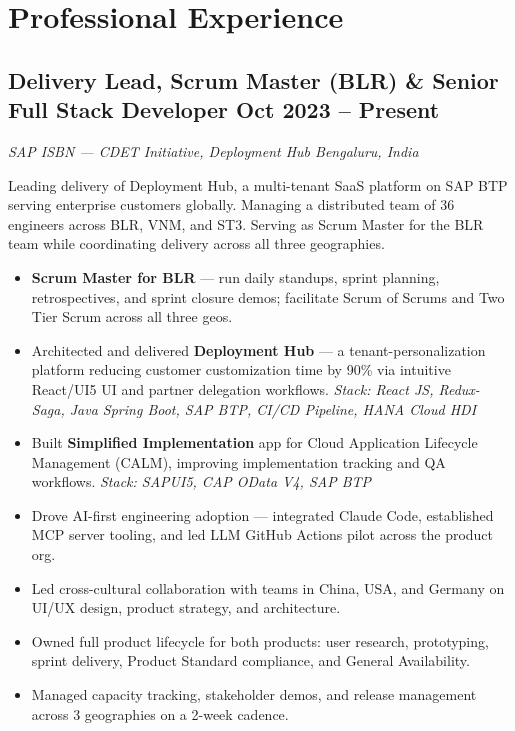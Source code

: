 \documentclass[11pt,a4paper]{article}
\begin{document}
\section{Professional Experience}

\subsection{Delivery Lead, Scrum Master (BLR) \& Senior Full Stack Developer \hfill \normalfont\small Oct 2023 -- Present}
\textit{SAP ISBN --- CDET Initiative, Deployment Hub \quad Bengaluru, India}

Leading delivery of Deployment Hub, a multi-tenant SaaS platform on SAP BTP serving enterprise
customers globally. Managing a distributed team of 36 engineers across BLR, VNM, and ST3.
Serving as Scrum Master for the BLR team while coordinating delivery across all three geographies.

\begin{itemize}
  \item \textbf{Scrum Master for BLR} --- run daily standups, sprint planning, retrospectives, and sprint
        closure demos; facilitate Scrum of Scrums and Two Tier Scrum across all three geos.
  \item Architected and delivered \textbf{Deployment Hub} --- a tenant-personalization platform reducing
        customer customization time by 90\% via intuitive React/UI5 UI and partner delegation workflows.
        \textit{Stack: React JS, Redux-Saga, Java Spring Boot, SAP BTP, CI/CD Pipeline, HANA Cloud HDI}
  \item Built \textbf{Simplified Implementation} app for Cloud Application Lifecycle Management (CALM),
        improving implementation tracking and QA workflows.
        \textit{Stack: SAPUI5, CAP OData V4, SAP BTP}
  \item Drove AI-first engineering adoption --- integrated Claude Code, established MCP server tooling,
        and led LLM GitHub Actions pilot across the product org.
  \item Led cross-cultural collaboration with teams in China, USA, and Germany on UI/UX design,
        product strategy, and architecture.
  \item Owned full product lifecycle for both products: user research, prototyping, sprint delivery,
        Product Standard compliance, and General Availability.
  \item Managed capacity tracking, stakeholder demos, and release management
        across 3 geographies on a 2-week cadence.
\end{itemize}
\end{document}
